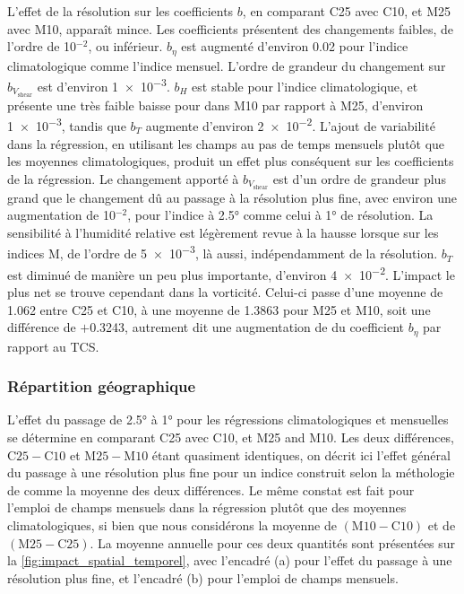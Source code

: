 \documentclass[../main.tex]{subfiles}
\begin{document}
L'effet de la résolution sur les coefficients $b$, en comparant C25 avec C10, et M25 avec M10, apparaît mince. Les coefficients présentent des changements
faibles, de l'ordre de \num{10}$^{\num{-2}}$, ou inférieur. $b_{\eta}$ est augmenté d'environ \num{0.02} pour l'indice climatologique comme l'indice mensuel.
L'ordre de grandeur du changement sur $b_{V_{\mathrm{shear}}}$ est d'environ \num{1e-3}. $b_H$ est stable pour l'indice climatologique, et présente une très
faible baisse pour dans M10 par rapport à M25, d'environ \num{1e-3}, tandis que $b_T$ augmente d'environ \num{2e-2}. L'ajout de variabilité dans la régression,
en utilisant les champs au pas de temps mensuels plutôt que les moyennes climatologiques, produit un effet plus conséquent sur les coefficients de la
régression. Le changement apporté à $b_{V_{\mathrm{shear}}}$ est d'un ordre de grandeur plus grand que le changement dû au passage à la résolution plus fine,
avec environ une augmentation de \num{10}$^{\num{-2}}$, pour l'indice à \ang{2.5} comme celui à \ang{1} de résolution. La sensibilité à l'humidité relative est
légèrement revue à la hausse lorsque sur les indices M, de l'ordre de \num{5e-3}, là aussi, indépendamment de la résolution. $b_T$ est diminué de manière un peu
plus importante, d'environ \num{4e-2}. L'impact le plus net se trouve cependant dans la vorticité. Celui-ci passe d'une moyenne de \num{1.062} entre C25 et C10,
à une moyenne de \num{1.3863} pour M25 et M10, soit une différence de $+$\num{0.3243}, autrement dit une augmentation de  du coefficient $b_{\eta}$
par rapport au TCS.

\subsubsection{Répartition géographique}\label{sec:repartition_geographique}

L'effet du passage de \ang{2.5} à \ang{1} pour les régressions climatologiques et mensuelles se détermine en comparant C25 avec C10, et M25 and M10. Les deux
différences, $\mathrm{C25} - \mathrm{C10}$ et $\mathrm{M25} - \mathrm{M10}$ étant quasiment identiques, on décrit ici l'effet général du passage à une
résolution plus fine pour un indice construit selon la méthologie de \textcite{tippett_poisson_2011} comme la moyenne des deux différences. Le même constat est
fait pour l'emploi de champs mensuels dans la régression plutôt que des moyennes climatologiques, si bien que nous considérons la moyenne de $(\mathrm{M10} -
\mathrm{C10})$ et de $(\mathrm{M25} - \mathrm{C25})$. La moyenne annuelle pour ces deux quantités sont présentées sur la \cref{fig:impact_spatial_temporel},
avec l'encadré (a) pour l'effet du passage à une résolution plus fine, et l'encadré (b) pour l'emploi de champs mensuels.
\end{document}
